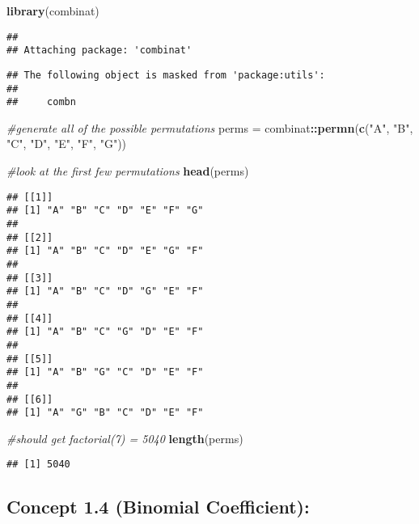\documentclass[
]{article}
\newenvironment{Shaded}{\begin{snugshade}}{\end{snugshade}}
\newcommand{\CommentTok}[1]{\textcolor[rgb]{0.56,0.35,0.01}{\textit{#1}}}
\newcommand{\FunctionTok}[1]{\textcolor[rgb]{0.13,0.29,0.53}{\textbf{#1}}}
\newcommand{\NormalTok}[1]{#1}
\newcommand{\OtherTok}[1]{\textcolor[rgb]{0.56,0.35,0.01}{#1}}
\newcommand{\SpecialCharTok}[1]{\textcolor[rgb]{0.81,0.36,0.00}{\textbf{#1}}}
\newcommand{\StringTok}[1]{\textcolor[rgb]{0.31,0.60,0.02}{#1}}
\begin{document}
\begin{Shaded}
\begin{Highlighting}[]
\FunctionTok{library}\NormalTok{(combinat)}
\end{Highlighting}
\end{Shaded}

\begin{verbatim}
## 
## Attaching package: 'combinat'
\end{verbatim}

\begin{verbatim}
## The following object is masked from 'package:utils':
## 
##     combn
\end{verbatim}

\begin{Shaded}
\begin{Highlighting}[]
\CommentTok{\#generate all of the possible permutations}
\NormalTok{perms }\OtherTok{=}\NormalTok{ combinat}\SpecialCharTok{::}\FunctionTok{permn}\NormalTok{(}\FunctionTok{c}\NormalTok{(}\StringTok{"A"}\NormalTok{, }\StringTok{"B"}\NormalTok{, }\StringTok{"C"}\NormalTok{, }\StringTok{"D"}\NormalTok{, }\StringTok{"E"}\NormalTok{, }\StringTok{"F"}\NormalTok{, }\StringTok{"G"}\NormalTok{))}

\CommentTok{\#look at the first few permutations}
\FunctionTok{head}\NormalTok{(perms)}
\end{Highlighting}
\end{Shaded}

\begin{verbatim}
## [[1]]
## [1] "A" "B" "C" "D" "E" "F" "G"
## 
## [[2]]
## [1] "A" "B" "C" "D" "E" "G" "F"
## 
## [[3]]
## [1] "A" "B" "C" "D" "G" "E" "F"
## 
## [[4]]
## [1] "A" "B" "C" "G" "D" "E" "F"
## 
## [[5]]
## [1] "A" "B" "G" "C" "D" "E" "F"
## 
## [[6]]
## [1] "A" "G" "B" "C" "D" "E" "F"
\end{verbatim}

\begin{Shaded}
\begin{Highlighting}[]
\CommentTok{\#should get factorial(7) = 5040}
\FunctionTok{length}\NormalTok{(perms)}
\end{Highlighting}
\end{Shaded}

\begin{verbatim}
## [1] 5040
\end{verbatim}

\hypertarget{concept-1.4-binomial-coefficient}{%
\subsection{Concept 1.4 (Binomial
Coefficient):}\label{concept-1.4-binomial-coefficient}}
\end{document}
